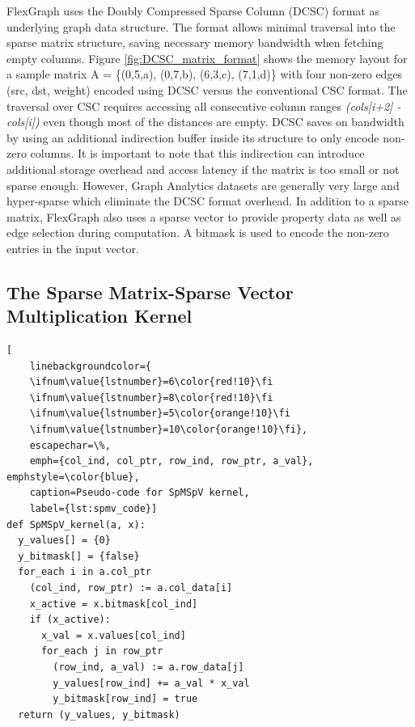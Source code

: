 FlexGraph uses the Doubly Compressed Sparse Column (DCSC) \cite{DCSC} format as underlying graph data structure. The format allows minimal traversal into the sparse matrix structure, saving necessary memory bandwidth when fetching empty columns. Figure \ref{fig:DCSC_matrix_format} shows the memory layout for a sample matrix A = \{(0,5,a), (0,7,b), (6,3,c), (7,1,d)\} with four non-zero edges (src, dst, weight) encoded using DCSC versus the conventional CSC \cite{CSC} format. The traversal over CSC requires accessing all consecutive column ranges \textit{(cols[i+2] - cols[i])} even though most of the distances are empty. DCSC saves on bandwidth by using an additional indirection  buffer inside its structure to only encode non-zero columns. It is important to note that this indirection can introduce additional storage overhead and access latency if the matrix is too small or not sparse enough. However, Graph Analytics datasets are generally very large and hyper-sparse which eliminate the DCSC format overhead. In addition to a sparse matrix, FlexGraph also uses a sparse vector to provide property data as well as edge selection during computation. A bitmask is used to encode the non-zero entries in the input vector.

\subsection{The Sparse Matrix-Sparse Vector Multiplication Kernel}

\begin{lstlisting}[
	linebackgroundcolor={
	\ifnum\value{lstnumber}=6\color{red!10}\fi
	\ifnum\value{lstnumber}=8\color{red!10}\fi
	\ifnum\value{lstnumber}=5\color{orange!10}\fi
	\ifnum\value{lstnumber}=10\color{orange!10}\fi}, 
    escapechar=\%, 
    emph={col_ind, col_ptr, row_ind, row_ptr, a_val}, emphstyle=\color{blue}, 
    caption=Pseudo-code for SpMSpV kernel,
    label={lst:spmv_code}]
def SpMSpV_kernel(a, x):
  y_values[] = {0}
  y_bitmask[] = {false}
  for_each i in a.col_ptr
    (col_ind, row_ptr) := a.col_data[i]
    x_active = x.bitmask[col_ind]          
    if (x_active):                            
      x_val = x.values[col_ind]              
      for_each j in row_ptr
        (row_ind, a_val) := a.row_data[j]
        y_values[row_ind] += a_val * x_val
        y_bitmask[row_ind] = true          
  return (y_values, y_bitmask)
\end{lstlisting}

